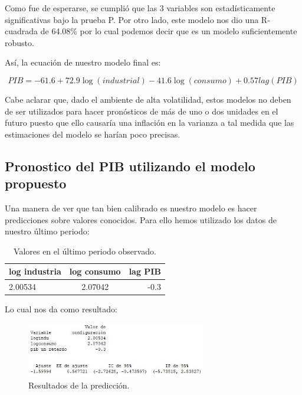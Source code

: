 \documentclass[a4paper]{article}
\begin{document}
Como fue de esperarse, se cumplió que las 3 variables son estadísticamente significativas bajo la prueba P. Por otro lado, este modelo nos dio una R-cuadrada de 64.08\% por lo cual podemos decir que es un modelo suficientemente robusto.

Así, la ecuación de nuestro modelo final es: 

\begin{equation}
    PIB = -61.6 + 72.9 \log(industrial) -41.6 \log(consumo) + 0.57 lag(PIB) 
\end{equation}

Cabe aclarar que, dado el ambiente de alta volatilidad, estos modelos no deben de ser utilizados para hacer pronósticos de más de uno o dos unidades en el futuro puesto que ello causaría una inflación en la varianza a tal medida que las estimaciones del modelo se harían poco precisas.

\newpage

\subsection{Pronostico del PIB utilizando el modelo propuesto}

Una manera de ver que tan bien calibrado es nuestro modelo es hacer predicciones sobre valores conocidos. Para ello hemos utilizado los datos de nuestro último periodo:

\begin{table}[h]
\centering
\begin{tabular}{l c r} 
log industria & log consumo & lag PIB \\ \hline
2.00534 & 2.07042 & -0.3
\end{tabular}
\caption{\label{tab:tabla ejemplo}Valores en el último periodo observado.}
\end{table}

Lo cual nos da como resultado:

\begin{figure}[h]
\centering
\includegraphics[width=0.7\textwidth]{10.jpg}
\caption{\label{fig:tesla}Resultados de la predicción.}
\end{figure}
\end{document}
